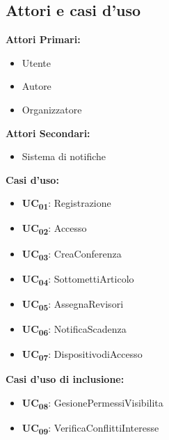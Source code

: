 \subsection{Attori e casi d'uso}
\begin{center}
\begin{minipage}[t]{0.5\textwidth}
\textbf{Attori Primari:}
\begin{itemize}
\item Utente
\item Autore
\item Organizzatore
\end{itemize}  
\end{minipage}%
\begin{minipage}[t]{0.5\textwidth}
\textbf{Attori Secondari:}
\begin{itemize}
\item Sistema di notifiche
\end{itemize}  
\end{minipage}%
\end{center}

\noindent
\textbf{Casi d'uso:}
\begin{itemize}
\item \textbf{UC\textsubscript{01}}: Registrazione
\item \textbf{UC\textsubscript{02}}: Accesso
\item \textbf{UC\textsubscript{03}}: CreaConferenza
\item \textbf{UC\textsubscript{04}}: SottomettiArticolo
\item \textbf{UC\textsubscript{05}}: AssegnaRevisori
\item \textbf{UC\textsubscript{06}}: NotificaScadenza
\item \textbf{UC\textsubscript{07}}: DispositivodiAccesso
\end{itemize}

\textbf{Casi d'uso di inclusione:}
\begin{itemize}
\item \textbf{UC\textsubscript{08}}: GesionePermessiVisibilita
\item \textbf{UC\textsubscript{09}}: VerificaConflittiInteresse
\end{itemize}

